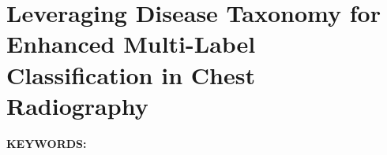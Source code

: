 \renewcommand{\figurepath}[1]{Chapters/taxonomy/figures/#1}

\chapter{Leveraging Disease Taxonomy for Enhanced Multi-Label Classification in Chest Radiography}\label{ch:taxonomy}

%

\textbf{KEYWORDS:\;} %

\newpage


